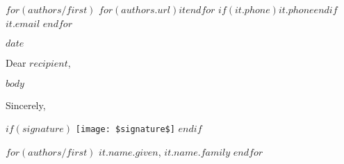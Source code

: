 \documentclass[letterpaper,11pt]{article} %
\makeatletter
\newcommand{\resumeHeading}[6]{
    \StrSubstitute{#3}{https://github.com/}{}[\github]
    \StrSubstitute{#4}{https://www.linkedin.com/in/}{}[\linkedin]
    \begin{center}
        \color{SeparatorPink}\transparent{0.5}
        \rule{0.9\textwidth}{1pt}\\
        \vspace{1pt}
        \color{HeaderBrown}\transparent{1.0}
        \href{#2}{\timesnewroman\Large\addfontfeatures{LetterSpace=15}\MakeUppercase{#1}} \\
        \vspace{5pt}
        {
            \avenirnext\small
            {Github: \href{#3}{\uline{@\github}}}\hspace{2pt}
            {LinkedIn: \href{#4}{\uline{@\linkedin}}}\hspace{2pt}
            \ifthenelse{\isempty{#5}}{}{#5\hspace{2pt}} %
            {\href{mailto:#6}{\uline{#6}}}
        }
        \color{SeparatorPink}\transparent{0.5}
        \rule{0.9\textwidth}{3pt}
    \end{center}
}
\makeatother
\begin{document}
\normalsize %

$for(authors/first)$
$for(authors.url)${$it$}$endfor$
{$if(it.phone)$$it.phone$$endif$}{$it.email$}
$endfor$

$date$\newline

Dear $recipient$,\newline

$body$

Sincerely,

$if(signature)$
\vspace{.1cm}\hspace{-.5cm}\texttt{[image: \$signature\$]}
$endif$

$for(authors/first)$
$it.name.given$, $it.name.family$
$endfor$
\end{document}
